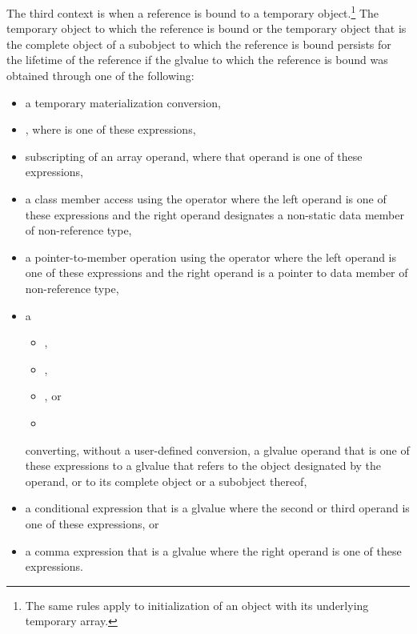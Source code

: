 \pnum
The third context is when a reference is bound to a
temporary object.\footnote{The same rules apply to initialization of an
   object with its
  underlying temporary array.}
The temporary object to which the reference is bound or the temporary object
that is the complete object of a subobject to which the reference is bound
persists for the lifetime of the reference if the glvalue
to which the reference is bound
was obtained through one of the following:
\begin{itemize}
\item
  a temporary materialization conversion,
\item
  \tcode{(}  \tcode{)},
  where  is one of these expressions,
\item
  subscripting of an array operand,
  where that operand is one of these expressions,
\item
  a class member access using the  operator
  where the left operand is one of these expressions and
  the right operand designates a non-static data member of non-reference type,
\item
  a pointer-to-member operation using the  operator
  where the left operand is one of these expressions and
  the right operand is a pointer to data member of non-reference type,
\item
  a
  \begin{itemize}
  \item {},
  \item {},
  \item {}, or
  \item {}
  \end{itemize}
  converting, without a user-defined conversion,
  a glvalue operand that is one of these expressions
  to a glvalue that refers
  to the object designated by the operand, or
  to its complete object or a subobject thereof,
\item
  a conditional expression that is a glvalue
  where the second or third operand is one of these expressions, or
\item
  a comma expression that is a glvalue
  where the right operand is one of these expressions.
\end{itemize}
